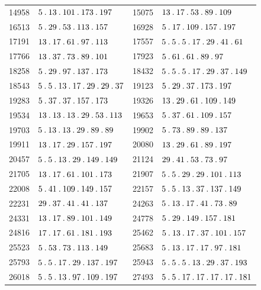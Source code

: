 \begin{longtable}{@{}r|l@{\qquad}r|l@{}}
14958 & $5\pdot 13\pdot 101\pdot 173\pdot 197$ & 15075 & $13\pdot 17\pdot 53\pdot 89\pdot 109$\\
16513 & $5\pdot 29\pdot 53\pdot 113\pdot 157$ & 16928 & $5\pdot 17\pdot 109\pdot 157\pdot 197$\\
17191 & $13\pdot 17\pdot 61\pdot 97\pdot 113$ & 17557 & $5\pdot 5\pdot 5\pdot 17\pdot 29\pdot 41\pdot 61$\\
17766 & $13\pdot 37\pdot 73\pdot 89\pdot 101$ & 17923 & $5\pdot 61\pdot 61\pdot 89\pdot 97$\\
18258 & $5\pdot 29\pdot 97\pdot 137\pdot 173$ & 18432 & $5\pdot 5\pdot 5\pdot 17\pdot 29\pdot 37\pdot 149$\\
18543 & $5\pdot 5\pdot 13\pdot 17\pdot 29\pdot 29\pdot 37$ & 19123 & $5\pdot 29\pdot 37\pdot 173\pdot 197$\\
19283 & $5\pdot 37\pdot 37\pdot 157\pdot 173$ & 19326 & $13\pdot 29\pdot 61\pdot 109\pdot 149$\\
19534 & $13\pdot 13\pdot 13\pdot 29\pdot 53\pdot 113$ & 19653 & $5\pdot 37\pdot 61\pdot 109\pdot 157$\\
19703 & $5\pdot 13\pdot 13\pdot 29\pdot 89\pdot 89$ & 19902 & $5\pdot 73\pdot 89\pdot 89\pdot 137$\\
19911 & $13\pdot 17\pdot 29\pdot 157\pdot 197$ & 20080 & $13\pdot 29\pdot 61\pdot 89\pdot 197$\\
20457 & $5\pdot 5\pdot 13\pdot 29\pdot 149\pdot 149$ & 21124 & $29\pdot 41\pdot 53\pdot 73\pdot 97$\\
21705 & $13\pdot 17\pdot 61\pdot 101\pdot 173$ & 21907 & $5\pdot 5\pdot 29\pdot 29\pdot 101\pdot 113$\\
22008 & $5\pdot 41\pdot 109\pdot 149\pdot 157$ & 22157 & $5\pdot 5\pdot 13\pdot 37\pdot 137\pdot 149$\\
22231 & $29\pdot 37\pdot 41\pdot 41\pdot 137$ & 24263 & $5\pdot 13\pdot 17\pdot 41\pdot 73\pdot 89$\\
24331 & $13\pdot 17\pdot 89\pdot 101\pdot 149$ & 24778 & $5\pdot 29\pdot 149\pdot 157\pdot 181$\\
24816 & $17\pdot 17\pdot 61\pdot 181\pdot 193$ & 25462 & $5\pdot 13\pdot 17\pdot 37\pdot 101\pdot 157$\\
25523 & $5\pdot 53\pdot 73\pdot 113\pdot 149$ & 25683 & $5\pdot 13\pdot 17\pdot 17\pdot 97\pdot 181$\\
25793 & $5\pdot 5\pdot 17\pdot 29\pdot 137\pdot 197$ & 25943 & $5\pdot 5\pdot 5\pdot 13\pdot 29\pdot 37\pdot 193$\\
26018 & $5\pdot 5\pdot 13\pdot 97\pdot 109\pdot 197$ & 27493 & $5\pdot 5\pdot 17\pdot 17\pdot 17\pdot 17\pdot 181$\\

\end{longtable}
